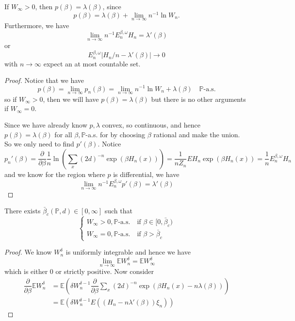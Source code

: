 \begin{proposition}
    If $W_{\infty} > 0$, then $p(\beta) = \lambda(\beta)$, since
    \[
    p(\beta) = \lambda(\beta) + \lim_{n\to\infty} n^{-1}\ln W_n.
    \]
    Furthermore, we have
    \[
    \lim_{n\to\infty} n^{-1}E_n^{\beta,\omega}H_n = \lambda'(\beta)
    \]
    or
    \[
    E_n^{\beta,\omega} |H_n/n- \lambda'(\beta)| \to 0
    \]
    with $n\to\infty$ expect an at most countable set.
\end{proposition}
\begin{proof}
    Notice that we have
    \[p(\beta) = \lim_{n\to\infty} p_n(\beta) = \lim_{n\to\infty}n^{-1}\ln W_n + \lambda(\beta)\quad\mathbb{P}\text{-a.s.}\]
    so if $W_{\infty} > 0$, then we will have $p(\beta) = \lambda(\beta)$ but there is no other arguments if $W_{\infty} = 0$.\par
    Since we have already know $p,\lambda$ convex, so continuous, and hence $p(\beta) = \lambda(\beta)$ for all $\beta, \mathbb{P}$-a.s. for by choosing $\beta$ rational and make the union. So we only need to find $p'(\beta)$. Notice
    \[
    p_n'(\beta) = \dfrac{\partial}{\partial \beta} \dfrac{1}{n}\ln(\sum\limits_{x} (2d)^{-n} \exp(\beta H_n(x))) = \dfrac{1}{nZ_n}EH_n \exp(\beta H_n(x)) = \dfrac{1}{n}E_{n}^{\beta,\omega}H_n
    \]
    and we know for the region where $p$ is differential, we have
    \[
    \lim_{n\to\infty} n^{-1} E_n^{\beta,\omega} p'(\beta) = \lambda'(\beta)
    \]
\end{proof}

\begin{proposition}
    There exists $\bar{\beta}_c(\mathbb{P},d) \in [0,\infty]$ such that
    \[
    \begin{cases}
        W_{\infty} > 0, \mathbb{P}\text{-a.s.}\quad\text{if }\beta\in[0,\bar{\beta}_c) \\
        W_{\infty} = 0, \mathbb{P}\text{-a.s.}\quad\text{if }\beta>\bar{\beta}_c
    \end{cases}
    \]
\end{proposition}
\begin{proof}
    We know $W_n^{\delta}$ is uniformly integrable and hence we have
    \[
    \lim\limits_{n\to\infty} \mathbb{E}W_n^{\delta} = \mathbb{E}W_{\infty}^{\delta}
    \]
    which is either $0$ or strictly positive. Now consider
    \[
    \begin{aligned}
        \dfrac{\partial}{\partial \beta} \mathbb{E}W_{n}^{\delta} & = \mathbb{E}(\delta W_n^{\delta-1} \dfrac{\partial}{\partial \beta} \sum\limits_{x} (2d)^{-n} \exp{(\beta H_n(x) - n\lambda(\beta))})\\
        & = \mathbb{E}(\delta W_n^{\delta-1}E((H_n-n\lambda'(\beta))\xi_n))
    \end{aligned}
    \]
\end{proof}

